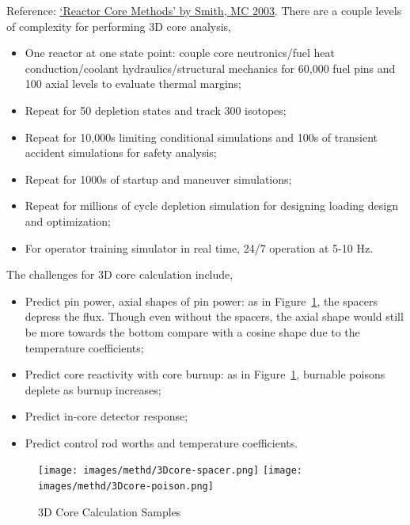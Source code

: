 \documentclass{school-22.211-notes}
\date{May  2, 2012}
\begin{document}
\maketitle

 \label{nodal-methods}
Reference: \href{www.oecd-nea.org/dbprog/documents/MC03Smith.pdf}{`Reactor Core Methods' by Smith, MC 2003}. 
There are a couple levels of complexity for performing 3D core analysis,
\begin{itemize}
\item One reactor at one state point: couple core neutronics/fuel heat conduction/coolant hydraulics/structural mechanics for 60,000 fuel pins and 100 axial levels to evaluate thermal margins;
\item Repeat for 50 depletion states and track 300 isotopes;
\item Repeat for 10,000s limiting conditional simulations and 100s of transient accident simulations for safety analysis;
\item Repeat for 1000s of startup and maneuver simulations;
\item Repeat for millions of cycle depletion simulation for designing loading design and optimization;
\item For operator training simulator in real time, 24/7 operation at 5-10 Hz. 
\end{itemize}
The challenges for 3D core calculation include,
\begin{itemize}
\item Predict pin power, axial shapes of pin power: as in Figure~\ref{3Dcore}, the spacers depress the flux. Though even without the spacers, the axial shape would still be more towards the bottom compare with a cosine shape due to the temperature coefficients; 
\item Predict core reactivity with core burnup: as in Figure~\ref{3Dcore}, burnable poisons deplete as burnup increases;
\item Predict in-core detector response;
\item Predict control rod worths and temperature coefficients. 
\end{itemize}
\begin{figure}[ht]
  \centering
  \texttt{[image: images/methd/3Dcore-spacer.png]}
  \texttt{[image: images/methd/3Dcore-poison.png]}
  \caption{3D Core Calculation Samples} \label{3Dcore}
\end{figure}
\end{document}
